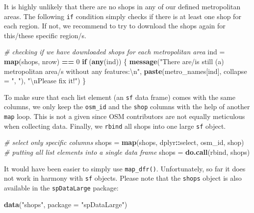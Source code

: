 \documentclass[]{krantz}
\newenvironment{Shaded}{\begin{snugshade}}{\end{snugshade}}
\newcommand{\CharTok}[1]{\textcolor[rgb]{0.5,0.5,0.5}{#1}}
\newcommand{\CommentTok}[1]{\textcolor[rgb]{0.37,0.37,0.37}{\textit{#1}}}
\newcommand{\ControlFlowTok}[1]{\textcolor[rgb]{0.27,0.27,0.27}{\textbf{#1}}}
\newcommand{\DataTypeTok}[1]{\textcolor[rgb]{0.27,0.27,0.27}{#1}}
\newcommand{\DecValTok}[1]{\textcolor[rgb]{0.06,0.06,0.06}{#1}}
\newcommand{\KeywordTok}[1]{\textcolor[rgb]{0.27,0.27,0.27}{\textbf{#1}}}
\newcommand{\NormalTok}[1]{#1}
\newcommand{\OperatorTok}[1]{\textcolor[rgb]{0.43,0.43,0.43}{\textbf{#1}}}
\newcommand{\StringTok}[1]{\textcolor[rgb]{0.5,0.5,0.5}{#1}}
\begin{document}
It is highly unlikely that there are no shops in any of our defined metropolitan areas.
The following \texttt{if} condition simply checks if there is at least one shop for each region.
If not, we recommend to try to download the shops again for this/these specific region/s.

\begin{Shaded}
\begin{Highlighting}[]
\CommentTok{# checking if we have downloaded shops for each metropolitan area}
\NormalTok{ind =}\StringTok{ }\KeywordTok{map}\NormalTok{(shops, nrow) }\OperatorTok{==}\StringTok{ }\DecValTok{0}
\ControlFlowTok{if}\NormalTok{ (}\KeywordTok{any}\NormalTok{(ind)) \{}
  \KeywordTok{message}\NormalTok{(}\StringTok{"There are/is still (a) metropolitan area/s without any features:}\CharTok{\textbackslash{}n}\StringTok{"}\NormalTok{,}
          \KeywordTok{paste}\NormalTok{(metro_names[ind], }\DataTypeTok{collapse =} \StringTok{", "}\NormalTok{), }\StringTok{"}\CharTok{\textbackslash{}n}\StringTok{Please fix it!"}\NormalTok{)}
\NormalTok{\}}
\end{Highlighting}
\end{Shaded}

To make sure that each list element (an \texttt{sf} data frame) comes with the same columns, we only keep the \texttt{osm\_id} and the \texttt{shop} columns with the help of another \texttt{map} loop.
This is not a given since OSM contributors are not equally meticulous when collecting data.
Finally, we \texttt{rbind} all shops into one large \texttt{sf} object.

\begin{Shaded}
\begin{Highlighting}[]
\CommentTok{# select only specific columns}
\NormalTok{shops =}\StringTok{ }\KeywordTok{map}\NormalTok{(shops, dplyr}\OperatorTok{::}\NormalTok{select, osm_id, shop)}
\CommentTok{# putting all list elements into a single data frame}
\NormalTok{shops =}\StringTok{ }\KeywordTok{do.call}\NormalTok{(rbind, shops)}
\end{Highlighting}
\end{Shaded}

It would have been easier to simply use \texttt{map\_dfr()}.
Unfortunately, so far it does not work in harmony with \texttt{sf} objects.
Please note that the \texttt{shops} object is also available in the \texttt{spDataLarge} package:

\begin{Shaded}
\begin{Highlighting}[]
\KeywordTok{data}\NormalTok{(}\StringTok{"shops"}\NormalTok{, }\DataTypeTok{package =} \StringTok{"spDataLarge"}\NormalTok{)}
\end{Highlighting}
\end{Shaded}
\end{document}
